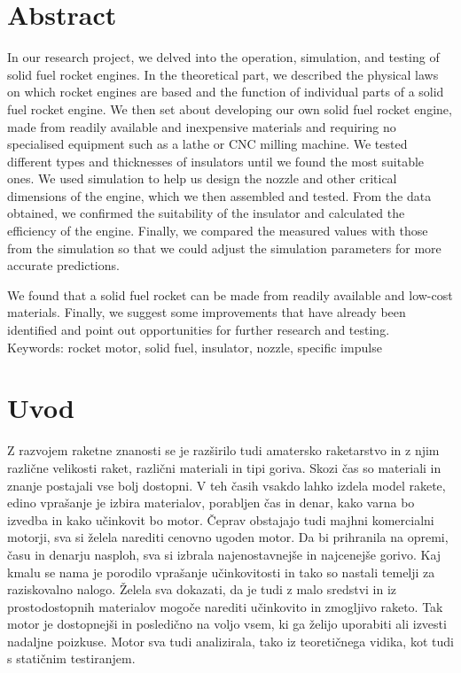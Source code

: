 \documentclass[titlepage, a4paper, twoside, final, 12pt]{article}
\begin{document}
\vspace{0.5cm}
\section*{Abstract}
		In our research project, we delved into the operation, simulation, and testing of solid fuel rocket engines. In the theoretical part, we described the physical laws on which rocket engines are based and the function of individual parts of a solid fuel rocket engine. We then set about developing our own solid fuel rocket engine, made from readily available and inexpensive materials and requiring no specialised equipment such as a lathe or CNC milling machine. We tested different types and thicknesses of insulators until we found the most suitable ones. We used simulation to help us design the nozzle and other critical dimensions of the engine, which we then assembled and tested. From the data obtained, we confirmed the suitability of the insulator and calculated the efficiency of the engine. Finally, we compared the measured values with those from the simulation so that we could adjust the simulation parameters for more accurate predictions.

		We found that a solid fuel rocket can be made from readily available and low-cost materials. Finally, we suggest some improvements that have already been identified and point out opportunities for further research and testing.
		\\[2ex]
		Keywords: rocket motor, solid fuel, insulator, nozzle, specific impulse
	

	\tableofcontents

	\listoftables

	\listoffigures

	\newpage

	\renewcommand{\thepage}{\arabic{page}}

		\section{Uvod}
		Z razvojem raketne znanosti se je razširilo tudi amatersko raketarstvo in z njim različne velikosti raket, različni materiali in tipi goriva. Skozi čas so
		materiali in znanje postajali vse bolj dostopni. V teh časih vsakdo lahko izdela model rakete, edino vprašanje je izbira materialov,
		porabljen čas in denar, kako varna bo izvedba in kako učinkovit bo motor. Čeprav obstajajo tudi majhni komercialni motorji, sva si želela narediti cenovno ugoden motor.
		Da bi prihranila na opremi, času in denarju nasploh, sva si izbrala najenostavnejše in najcenejše gorivo. Kaj kmalu se nama je porodilo vprašanje
		učinkovitosti in tako so nastali temelji za raziskovalno nalogo. Želela sva dokazati, da je tudi z malo sredstvi in iz
		prostodostopnih materialov mogoče narediti učinkovito in zmogljivo raketo. Tak motor je dostopnejši in posledično na voljo vsem, ki ga želijo uporabiti ali izvesti nadaljne poizkuse.
		Motor sva tudi analizirala, tako iz teoretičnega vidika, kot tudi s statičnim testiranjem.
		
\end{document}

